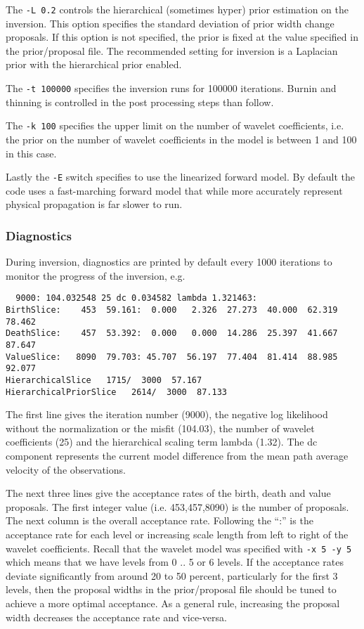 \documentclass[a4paper,12pt]{article}
\begin{document}
The {\tt -L 0.2} controls the hierarchical (sometimes hyper) prior estimation
on the inversion. This option specifies the standard deviation of prior
width change proposals. If this option is not specified, the prior is fixed
at the value specified in the prior/proposal file. The recommended
setting for inversion is a Laplacian prior with the hierarchical prior
enabled.

The {\tt -t 100000} specifies the inversion runs for 100000 iterations.
Burnin and thinning is controlled in the post processing steps than follow.

The {\tt -k 100} specifies the upper limit on the number of wavelet
coefficients, i.e. the prior on the number of wavelet coefficients in the
model is between 1 and 100 in this case.

Lastly the {\tt -E} switch specifies to use the linearized forward model.
By default the code uses a fast-marching forward model that while more accurately
represent physical propagation is far slower to run.

\subsubsection{Diagnostics}

During inversion, diagnostics are printed by default every 1000 iterations
to monitor the progress of the inversion, e.g.

\begin{verbatim}
  9000: 104.032548 25 dc 0.034582 lambda 1.321463:
BirthSlice:    453  59.161:  0.000   2.326  27.273  40.000  62.319  78.462 
DeathSlice:    457  53.392:  0.000   0.000  14.286  25.397  41.667  87.647 
ValueSlice:   8090  79.703: 45.707  56.197  77.404  81.414  88.985  92.077
HierarchicalSlice   1715/  3000  57.167
HierarchicalPriorSlice   2614/  3000  87.133
\end{verbatim}

The first line gives the iteration number (9000), the negative log likelihood
without the normalization or the misfit (104.03), the number of wavelet
coefficients (25) and the hierarchical scaling term lambda (1.32). The dc
component represents the current model difference from the mean
path average velocity of the observations.

The next three lines give the acceptance rates of the birth, death and
value proposals. The first integer value (i.e. 453,457,8090) is the
number of proposals.  The next column is the overall acceptance
rate. Following the ``:'' is the acceptance rate for each level or
increasing scale length from left to right of the wavelet
coefficients. Recall that the wavelet model was specified with {\tt -x
  5 -y 5} which means that we have levels from 0 .. 5 or 6 levels.
If the acceptance rates deviate significantly from around 20 to 50
percent, particularly for the first 3 levels, then the proposal
widths in the prior/proposal file should be tuned to achieve a
more optimal acceptance. As a general rule, increasing the
proposal width decreases the acceptance rate and vice-versa.
\end{document}

